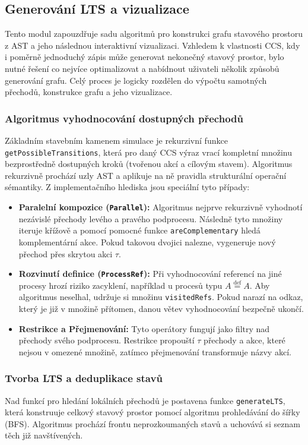 \subsection{Generování LTS a vizualizace}
\label{sec:generovani_lts}
Tento modul zapouzdřuje sadu algoritmů pro konstrukci grafu stavového prostoru z AST a jeho následnou interaktivní vizualizaci. 
Vzhledem k vlastnosti CCS, kdy i poměrně jednoduchý zápis může generovat nekonečný stavový prostor, bylo nutné řešení co nejvíce optimalizovat a nabídnout uživateli několik způsobů generování grafu. 
Celý proces je logicky rozdělen do výpočtu samotných přechodů, konstrukce grafu a jeho vizualizace.

\subsubsection*{Algoritmus vyhodnocování dostupných přechodů}
Základním stavebním kamenem simulace je rekurzivní funkce \texttt{getPossibleTransitions}, která pro daný CCS výraz vrací kompletní množinu bezprostředně dostupných kroků (tvořenou akcí a cílovým stavem). 
Algoritmus rekurzivně prochází uzly AST a aplikuje na ně pravidla strukturální operační sémantiky. 
Z implementačního hlediska jsou speciální tyto případy:
\begin{itemize}
    \item \textbf{Paralelní kompozice (\texttt{Parallel}):} 
    Algoritmus nejprve rekurzivně vyhodnotí nezávislé přechody levého a pravého podprocesu. 
    Následně tyto množiny iteruje křížově a pomocí pomocné funkce \texttt{areComplementary} hledá komplementární akce. 
    Pokud takovou dvojici nalezne, vygeneruje nový přechod přes skrytou akci $\tau$.
    \item \textbf{Rozvinutí definice (\texttt{ProcessRef}):} 
    Při vyhodnocování referencí na jiné procesy hrozí riziko zacyklení, například u procesů typu $A \stackrel{\text{def}}{=} A$. 
    Aby algoritmus neselhal, udržuje si množinu \texttt{visitedRefs}. 
    Pokud narazí na odkaz, který je již v množině přítomen, danou větev vyhodnocování bezpečně ukončí.
    \item \textbf{Restrikce a Přejmenování:} 
    Tyto operátory fungují jako filtry nad přechody svého podprocesu. 
    Restrikce propouští $\tau$ přechody a akce, které nejsou v omezené množině, zatímco přejmenování transformuje názvy akcí.
\end{itemize}

\subsubsection*{Tvorba LTS a deduplikace stavů}
Nad funkcí pro hledání lokálních přechodů je postavena funkce \texttt{generateLTS}, která konstruuje celkový stavový prostor pomocí algoritmu prohledávání do šířky (BFS). 
Algoritmus prochází frontu neprozkoumaných stavů a uchovává si seznam těch již navštívených.

